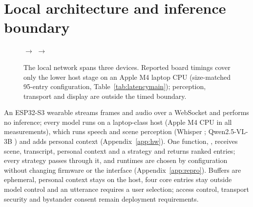 \section{Local architecture and inference boundary}\label{sec:system}
\begin{figure}[t]
\centering\footnotesize
{}
$\longrightarrow$
$\longrightarrow$
\caption{The local network spans three devices. Reported board timings cover only the lower host stage on an Apple M4 laptop CPU (size-matched 95-entry configuration, Table~\ref{tab:latencymain}); perception, transport and display are outside the timed boundary.}
\label{fig:system}
\end{figure}
An ESP32-S3 wearable streams frames and audio over a WebSocket and performs no inference; every model runs on a laptop-class host (Apple M4 CPU in all measurements), which runs speech and scene perception (Whisper \citep{whisper}; Qwen2.5-VL-3B \citep{qwen25vl}) and adds personal context (Appendix~\ref{app:hw}). One function, , receives scene, transcript, personal context and a strategy and returns ranked entries; every strategy passes through it, and runtimes are chosen by configuration without changing firmware or the interface (Appendix~\ref{app:repro}). Buffers are ephemeral, personal context stays on the host, four core entries stay outside model control and an utterance requires a user selection; access control, transport security and bystander consent remain deployment requirements.

